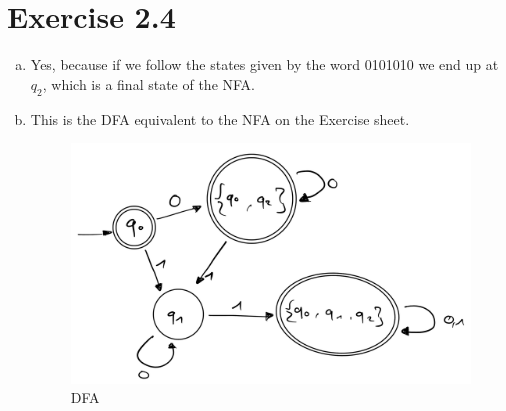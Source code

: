 \documentclass{article} %
\newcommand{\homeworkNumber}{2}
\begin{document}
\clearpage

\section*{Exercise \homeworkNumber.4}
\begin{enumerate}[(a)]
	\item
	Yes, because if we follow the states given by the word 0101010 we end up at
	$q_2$, which is a final state of the NFA.

	\item
	This is the DFA equivalent to the NFA on the Exercise sheet.
	\begin{figure}[H]
		\includegraphics[width=\linewidth]{ex4b.png}
		\centering
		\caption{DFA}
	\end{figure}
\end{enumerate}
\end{document}
